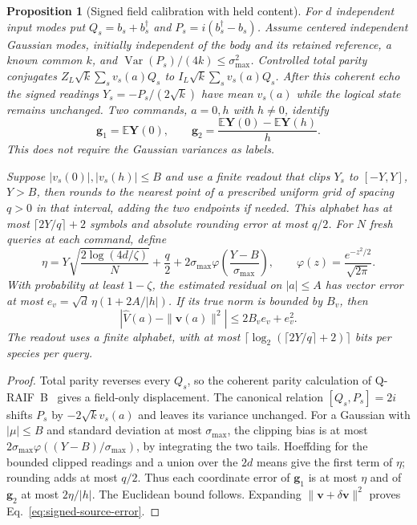 \documentclass[12pt,a4paper]{article}
\newtheorem{proposition}[theorem]{Proposition}
\begin{document}
\begin{proposition}[Signed field calibration with held content]
\label{prop:signed-source-calibration}
For $d$ independent input modes put $Q_s=b_s+b_s^\dagger$ and
$P_s=i(b_s^\dagger-b_s)$. Assume centered independent Gaussian modes,
initially independent of the body and its retained reference,
a known common $k$, and $\operatorname{Var}(P_s)/(4k)\le\sigma_{\max}^2$.
Controlled total parity conjugates
$Z_L\sqrt{k}\sum_s v_s(a)Q_s$ to
$I_L\sqrt{k}\sum_s v_s(a)Q_s$. After this coherent echo the signed
readings $Y_s=-P_s/(2\sqrt{k})$ have mean $v_s(a)$ while the logical
state remains unchanged. Two commands, $a=0,h$ with $h\ne0$, identify
\[
 \mathbf g_1=\mathbb E\mathbf Y(0),\qquad
 \mathbf g_2=\frac{\mathbb E\mathbf Y(0)-\mathbb E\mathbf Y(h)}h.
\]
This does not require the Gaussian variances as labels.

Suppose $|v_s(0)|,|v_s(h)|\le B$ and use a finite readout that clips $Y_s$
to $[-Y,Y]$, $Y>B$, then rounds to the nearest point of a prescribed
uniform grid of spacing $q>0$ in that interval, adding the two endpoints
if needed. This alphabet has at most $\lceil2Y/q\rceil+2$ symbols and
absolute rounding error at most $q/2$.
For $N$ fresh queries at each command, define
\[
 \eta=Y\sqrt{\frac{2\log(4d/\zeta)}N}+\frac q2+
       2\sigma_{\max}\varphi\!\left(\frac{Y-B}{\sigma_{\max}}\right),
 \qquad \varphi(z)=\frac{e^{-z^2/2}}{\sqrt{2\pi}}.
\]
With probability at least $1-\zeta$, the estimated residual on $|a|\le A$
has vector error at most $e_v=\sqrt d\,\eta(1+2A/|h|)$.
If its true norm is bounded by $B_v$, then
\begin{equation}
 |\widehat V(a)-\|\mathbf v(a)\|^2|\le2B_ve_v+e_v^2.
 \label{eq:signed-source-error}
\end{equation}
The readout uses a finite alphabet, with at most
$\lceil\log_2(\lceil2Y/q\rceil+2)\rceil$ bits per species per query.
\end{proposition}
\begin{proof}
Total parity reverses every $Q_s$, so the coherent parity calculation of
Q-RAIF~B~\cite{Liu2026QRAIFB} gives a field-only displacement.
The canonical relation $[Q_s,P_s]=2i$ shifts $P_s$ by
$-2\sqrt{k}v_s(a)$ and leaves its variance unchanged.
For a Gaussian with $|\mu|\le B$ and standard deviation at most
$\sigma_{\max}$, the clipping bias is at most
$2\sigma_{\max}\varphi((Y-B)/\sigma_{\max})$, by integrating the two
tails. Hoeffding for the bounded clipped readings and a union over the
$2d$ means give the first term of $\eta$; rounding adds at most $q/2$.
Thus each coordinate error of $\mathbf g_1$ is at most $\eta$ and of
$\mathbf g_2$ at most $2\eta/|h|$. The Euclidean bound follows.
Expanding $\|\mathbf v+\delta\mathbf v\|^2$ proves
Eq.~\eqref{eq:signed-source-error}.
\end{proof}
\end{document}
